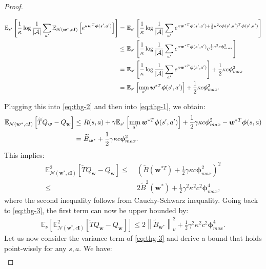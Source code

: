 \documentclass{article}
\newcommand{\mm}{\operatornamewithlimits{mm}}
\newcommand{\wt}[1]{\widetilde{#1}}
\newcommand{\norm}[1]{\left\lVert #1 \right\rVert}
\begin{document}
\begin{proof}
\begin{small}
\begin{align*}
\mathbb{E}_{s'}\left[\frac{1}{\kappa} \log \frac{1}{|\mathcal{A}|}\sum_{a'} \mathbb{E}_{\mathcal{N}(\bm{w}^*,c\bm{I})}\left[e^{\kappa\bm{w}^T\bm{\phi}(s',a')}\right]\right] =\ & \mathbb{E}_{s'}\left[\frac{1}{\kappa} \log \frac{1}{|\mathcal{A}|}\sum_{a'} e^{\kappa\bm{w}^{*T}\bm{\phi}(s',a') + \frac{1}{2}\kappa^2c\bm{\phi}(s',a')^T\bm{\phi}(s',a')}\right]\\ \leq\ & \mathbb{E}_{s'}\left[\frac{1}{\kappa} \log \frac{1}{|\mathcal{A}|}\sum_{a'} e^{\kappa\bm{w}^{*T}\bm{\phi}(s',a')}e^{\frac{1}{2}\kappa^2c\bm{\phi}_{max}^2}\right]\\ =\ & \mathbb{E}_{s'}\left[\frac{1}{\kappa} \log \frac{1}{|\mathcal{A}|}\sum_{a'} e^{\kappa\bm{w}^{*T}\bm{\phi}(s',a')}\right] + \frac{1}{2}\kappa c\bm{\phi}_{max}^2\\ =\ & \mathbb{E}_{s'}\left[\mm_{a'}\bm{w}^{*T}\bm{\phi}(s',a')\right] + \frac{1}{2}\kappa c\bm{\phi}_{max}^2.
\end{align*}
\end{small}
Plugging this into \eqref{eq:thg-2} and then into \eqref{eq:thg-1}, we obtain:
\begin{align*}
\mathbb{E}_{\mathcal{N}(\bm{w}^*,c\bm{I})}\left[\wt{T}Q_{\bm{w}}-Q_{\bm{w}}\right] \leq\ & R(s,a) + \gamma\mathbb{E}_{s'}\left[\mm_{a'}\bm{w}^{*T}\bm{\phi}(s',a')\right] + \frac{1}{2}\gamma\kappa c\bm{\phi}_{max}^2 - \bm{w}^{*T}\bm{\phi}(s,a)\\ =\ & \wt{B}_{\bm{w}^{*}} + \frac{1}{2}\gamma\kappa c\bm{\phi}_{max}^2.
\end{align*}
This implies:
\begin{align*}
\mathbb{E}^2_{\mathcal{N}(\bm{w}^*,c\bm{I})}\left[\wt{T}Q_{\bm{w}}-Q_{\bm{w}}\right] \leq\ & \left(\wt{B}(\bm{w}^{*T}) + \frac{1}{2}\gamma\kappa c\bm{\phi}_{max}^2\right)^2\\ \leq\ & 2\wt{B}^2(\bm{w}^{*}) + \frac{1}{2}\gamma^2\kappa^2 c^2\bm{\phi}_{max}^4,
\end{align*}
where the second inequality follows from Cauchy-Schwarz inequality. Going back to \eqref{eq:thg-3}, the first term can now be upper bounded by:
\begin{align*}
\mathbb{E}_{\nu}\left[\mathbb{E}_{\mathcal{N}(\bm{w}^*,c\bm{I})}^2\left[\wt{T}Q_{\bm{w}}-Q_{\bm{w}}\right]\right] \leq 2\norm{\wt{B}_{\bm{w}^{*}}}_{\nu}^2 + \frac{1}{2}\gamma^2\kappa^2 c^2\bm{\phi}_{max}^4.
\end{align*}
Let us now consider the variance term of \eqref{eq:thg-3} and derive a bound that holds point-wisely for any $s,a$. We have:
\begin{align*}

\end{align*}
\end{proof}
\end{document}
